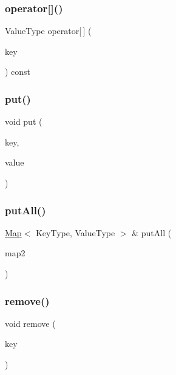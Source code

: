\subsubsection{\texorpdfstring{operator[]()}{operator[]()}\hspace{0.1cm}{\footnotesize\ttfamily [2/2]}}
{\footnotesize\ttfamily Value\+Type operator\mbox{[}$\,$\mbox{]} (\begin{DoxyParamCaption}\item[{const Key\+Type \&}]{key }\end{DoxyParamCaption}) const}

\mbox{\label{classMap_af0d1d70a37332cb3054fe5b1b170927c}} 
\subsubsection{\texorpdfstring{put()}{put()}}
{\footnotesize\ttfamily void put (\begin{DoxyParamCaption}\item[{const Key\+Type \&}]{key,  }\item[{const Value\+Type \&}]{value }\end{DoxyParamCaption})}

\mbox{\label{classMap_aa8f04a9b5782a099d73bb66377d9c110}} 
\subsubsection{\texorpdfstring{put\+All()}{putAll()}}
{\footnotesize\ttfamily \mbox{\hyperlink{classMap}{Map}}$<$ Key\+Type, Value\+Type $>$ \& put\+All (\begin{DoxyParamCaption}\item[{const \mbox{\hyperlink{classMap}{Map}}$<$ Key\+Type, Value\+Type $>$ \&}]{map2 }\end{DoxyParamCaption})}

\mbox{\label{classMap_ac6e7e5198a9f1c8b2cc40fbd1d0eb3b0}} 
\subsubsection{\texorpdfstring{remove()}{remove()}}
{\footnotesize\ttfamily void remove (\begin{DoxyParamCaption}\item[{const Key\+Type \&}]{key }\end{DoxyParamCaption})}

